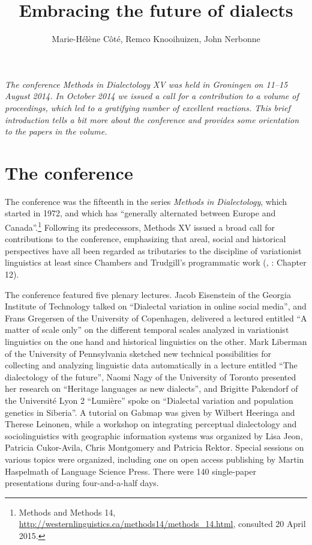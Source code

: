 \documentclass[output=paper]{LSP/langsci}
\author{Marie-Hélène Côté, Remco Knooihuizen, John Nerbonne}
\title{Embracing the future of dialects}
\begin{document}
% 


\textit{The conference Methods in Dialectology XV was held in Groningen on 11–15 August 2014. In October 2014 we issued a call for a contribution to a volume of proceedings, which led to a gratifying number of excellent reactions. This brief introduction tells a bit more about the conference and provides some orientation to the papers in the volume.  }

\section{The conference}
The conference was the fifteenth in the series \textit{Methods in Dialectology}, which started in 1972, and which has “generally alternated between Europe and Canada”.\footnote{Methods and Methods 14, \url{http://westernlinguistics.ca/methods14/methods_14.html}, consulted 20 April 2015.} Following its predecessors, Methods XV issued a broad call for contributions to the conference, emphasizing that areal, social and historical perspectives have all been regarded as tributaries to the discipline of variationist linguistics at least since Chambers and Trudgill’s programmatic work (\citealt{chambers_dialectology_1980}, \citealt{chambers_dialectology_1998}: Chapter 12).

The conference featured five plenary lectures. Jacob Eisenstein of the Georgia Institute of Technology talked on “Dialectal variation in online social media”, and Frans Gregersen of  the University of Copenhagen, delivered a lectured entitled “A matter of scale only” on the different temporal scales analyzed in variationist linguistics on the one hand and historical linguistics on the other. Mark Liberman of the University of Pennsylvania sketched new technical possibilities for collecting and analyzing linguistic data automatically in a lecture entitled “The dialectology of the future”, Naomi Nagy of the University of Toronto presented her research on “Heritage languages as new dialects”, and Brigitte Pakendorf of the Université Lyon 2 “Lumière” spoke on “Dialectal variation and population genetics in Siberia”.  A tutorial on Gabmap \citep{nerbonne_gabmap_2011} was given by Wilbert Heeringa and Therese Leinonen, while a workshop on integrating perceptual dialectology and sociolinguistics with geographic information systems was organized by Lisa Jeon, Patricia Cukor-Avila, Chris Montgomery and Patricia Rektor. Special sessions on various topics were organized, including one on open access publishing by Martin Haspelmath of Language Science Press.  There were 140 single-paper presentations during four-and-a-half days.
\end{document}
